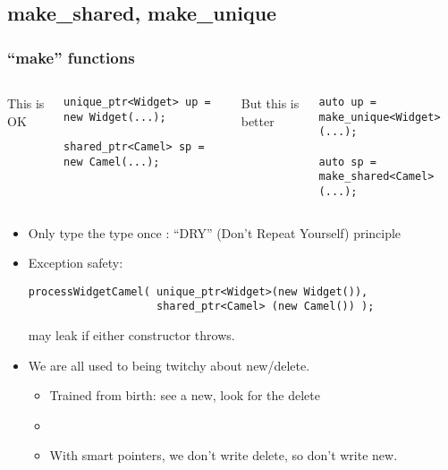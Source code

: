 \subsection{make\_shared, make\_unique}
\begin{frame}[fragile]
\frametitle{``make'' functions}
\begin{columns}[t]
This is OK
{\scriptsize\begin{verbatim}
unique_ptr<Widget> up = new Widget(...);

shared_ptr<Camel> sp = new Camel(...);
\end{verbatim}}
\pause{}
But this is better
{\scriptsize\begin{verbatim}
auto up = make_unique<Widget>(...);

auto sp = make_shared<Camel>(...);
\end{verbatim}}
\end{columns}
\vskip 12pt
\pause{}
\begin{itemize}
\item Only type the type once : ``DRY'' (Don't Repeat Yourself) principle
\vskip 6pt
\item Exception safety:
{\scriptsize\begin{verbatim}
processWidgetCamel( unique_ptr<Widget>(new Widget()),
                    shared_ptr<Camel> (new Camel()) );
\end{verbatim}}
may leak if either constructor throws.
\vskip 6pt
\item We are all used to being twitchy about new/delete.  
\begin{itemize}
  \item Trained from birth: see a new, look for the delete
  \item {}
  \item With smart pointers, we don't write delete, so don't write new.
  \end{itemize}
\end{itemize}
\pause{}

\end{frame}







